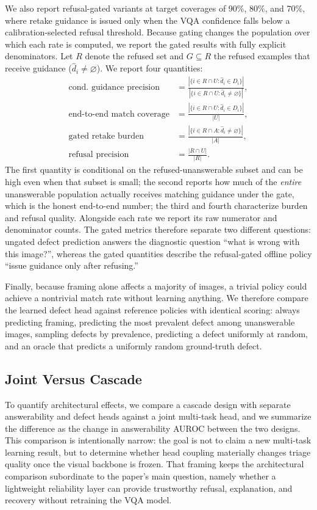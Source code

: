 \documentclass{ieeeaccess}
\begin{document}
We also report refusal-gated variants at target coverages of 90\%, 80\%, and 70\%, where retake guidance is issued only when the VQA confidence falls below a calibration-selected refusal threshold. Because gating changes the population over which each rate is computed, we report the gated results with fully explicit denominators. Let $R$ denote the refused set and $G \subseteq R$ the refused examples that receive guidance ($\hat{d}_i \neq \varnothing$). We report four quantities:
\begin{align}
\text{cond.\ guidance precision} &= \frac{|\{i \in R \cap U : \hat{d}_i \in D_i\}|}{|\{i \in R \cap U : \hat{d}_i \neq \varnothing\}|},\\
\text{end-to-end match coverage} &= \frac{|\{i \in R \cap U : \hat{d}_i \in D_i\}|}{|U|},\\
\text{gated retake burden} &= \frac{|\{i \in R \cap A : \hat{d}_i \neq \varnothing\}|}{|A|},\\
\text{refusal precision} &= \frac{|R \cap U|}{|R|}.
\end{align}
The first quantity is conditional on the refused-unanswerable subset and can be high even when that subset is small; the second reports how much of the \emph{entire} unanswerable population actually receives matching guidance under the gate, which is the honest end-to-end number; the third and fourth characterize burden and refusal quality. Alongside each rate we report its raw numerator and denominator counts. The gated metrics therefore separate two different questions: ungated defect prediction answers the diagnostic question ``what is wrong with this image?'', whereas the gated quantities describe the refusal-gated offline policy ``issue guidance only after refusing.''

Finally, because framing alone affects a majority of images, a trivial policy could achieve a nontrivial match rate without learning anything. We therefore compare the learned defect head against reference policies with identical scoring: always predicting framing, predicting the most prevalent defect among unanswerable images, sampling defects by prevalence, predicting a defect uniformly at random, and an oracle that predicts a uniformly random ground-truth defect.

\subsection{Joint Versus Cascade}
To quantify architectural effects, we compare a cascade design with separate answerability and defect heads against a joint multi-task head, and we summarize the difference as the change in answerability AUROC between the two designs. This comparison is intentionally narrow: the goal is not to claim a new multi-task learning result, but to determine whether head coupling materially changes triage quality once the visual backbone is frozen. That framing keeps the architectural comparison subordinate to the paper's main question, namely whether a lightweight reliability layer can provide trustworthy refusal, explanation, and recovery without retraining the VQA model.
\end{document}
